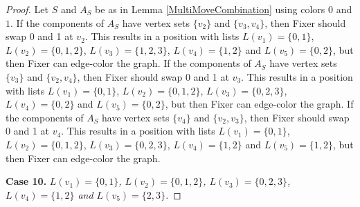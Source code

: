 \documentclass[12pt]{amsart}
\theoremstyle{plain}
\theoremstyle{definition}
\theoremstyle{remark}
\begin{document}
\begin{proof}
Let $S$ and $A_S$ be as in Lemma \ref{MultiMoveCombination} using colors $0$ and $1$. If the components of $A_S$ have vertex sets $\{v_2\}$ and $\{v_3, v_4\}$, then Fixer should swap 0 and 1 at $v_2$. This results in a position with lists $L(v_1) = \{0, 1\}$, $L(v_2) = \{0, 1, 2\}$, $L(v_3) = \{1, 2, 3\}$, $L(v_4) = \{1, 2\}$ and $L(v_5) = \{0, 2\}$, but then Fixer can edge-color the graph.
If the components of $A_S$ have vertex sets $\{v_3\}$ and $\{v_2, v_4\}$, then Fixer should swap 0 and 1 at $v_3$. This results in a position with lists $L(v_1) = \{0, 1\}$, $L(v_2) = \{0, 1, 2\}$, $L(v_3) = \{0, 2, 3\}$, $L(v_4) = \{0, 2\}$ and $L(v_5) = \{0, 2\}$, but then Fixer can edge-color the graph.
If the components of $A_S$ have vertex sets $\{v_4\}$ and $\{v_2, v_3\}$, then Fixer should swap 0 and 1 at $v_4$. This results in a position with lists $L(v_1) = \{0, 1\}$, $L(v_2) = \{0, 1, 2\}$, $L(v_3) = \{0, 2, 3\}$, $L(v_4) = \{1, 2\}$ and $L(v_5) = \{1, 2\}$, but then Fixer can edge-color the graph.

\noindent\textbf{Case 10.  }\textit{$L(v_1) = \{0, 1\}$, $L(v_2) = \{0, 1, 2\}$, $L(v_3) = \{0, 2, 3\}$, $L(v_4) = \{1, 2\}$ and $L(v_5) = \{2, 3\}$.}


\end{proof}
\end{document}
